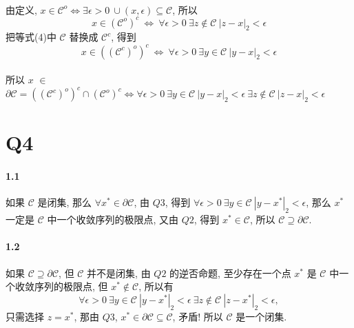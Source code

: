 \documentclass{article}
\begin{document}
\begin{CJK}{UTF8}{gbsn}
  \paragraph{}
    由定义, $x \in \mathcal{C}^o \iff \exists \epsilon > 0\ \cup(x, \epsilon) \subseteq \mathcal{C}$, 所以
    \begin{equation}
      x \in (\mathcal{C}^o)^c\ \iff\ \forall \epsilon > 0\ \exists z \not\in \mathcal{C}\ |z - x|_2 < \epsilon
    \end{equation}
    把等式(4)中 $\mathcal{C}$ 替换成 $\mathcal{C}^c$, 得到
    \begin{equation}
      x \in ((\mathcal{C}^c)^o)^c\ \iff\ \forall \epsilon > 0\ \exists y \in \mathcal{C}\ |y - x|_2 < \epsilon
    \end{equation}
  \paragraph{}
    所以 $x$ $\in$ $\partial\mathcal{C} = ((\mathcal{C}^c)^o)^c \cap (\mathcal{C}^o)^c \iff \forall \epsilon > 0\ \exists y \in \mathcal{C}\ |y - x|_2 < \epsilon\ \exists z \not\in \mathcal{C}\ |z - x|_2 < \epsilon$

\section{Q4}
  \paragraph{1.1} 如果 $\mathcal{C}$ 是闭集,  那么 $\forall x^* \in \partial \mathcal{C}$, 由 $Q3$, 得到 $\forall \epsilon > 0\ \exists y \in \mathcal{C}\ |y - x^*|_2 < \epsilon$, 那么 $x^*$ 一定是 $\mathcal{C}$ 中一个收敛序列的极限点, 又由 $Q2$, 得到 $x^* \in \mathcal{C}$, 所以 $\mathcal{C} \supseteq \partial \mathcal{C}$.
  \paragraph{1.2} 如果 $\mathcal{C} \supseteq \partial \mathcal{C}$, 但 $\mathcal{C}$ 并不是闭集, 由 $Q2$ 的逆否命题, 至少存在一个点 $x^*$ 是 $\mathcal{C}$ 中一个收敛序列的极限点, 但 $x^* \not\in \mathcal{C}$, 所以有
  \begin{equation}
    \forall \epsilon > 0\ \exists y \in \mathcal{C}\ |y - x^*|_2 < \epsilon\ \exists z \not\in \mathcal{C}\ |z - x^*|_2 < \epsilon,
  \end{equation}
  只需选择 $z = x^*$, 那由 $Q3$, $x^* \in \partial \mathcal{C} \subseteq \mathcal{C}$, 矛盾! 所以 $\mathcal{C}$ 是一个闭集.

\end{CJK}
\end{document}
